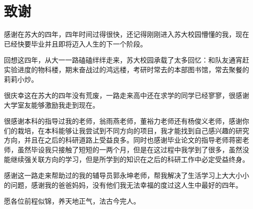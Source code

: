 \section*{致谢}

感谢在苏大的四年，四年时间过得很快，还记得刚刚进入苏大校园懵懂的我，现在已经快要毕业并且即将迈入人生的下一个阶段。

回想这四年，从大一一路磕磕绊绊走来，苏大校园承载了太多回忆：和队友通宵赶实验进度的物科楼，期末奋战过的鸿远楼，考研时常去的本部图书馆，常去聚餐的莉莉小炒。

很庆幸这在苏大的四年没有荒废，一路走来高中还在求学的同学已经寥寥，很感谢大学室友能够激励我走到现在。

很感谢本科的指导过我的老师，翁雨燕老师，董裕力老师还有杨俊义老师，感谢你们的栽培，在本科能够让我尝试到不同方向的项目，我才能找到自己感兴趣的研究方向，并且在之后的科研道路上受益良多。同时也感谢毕业论文的指导老师蒋密老师，虽然毕设我只接触了短短的一两个月，但是在这过程中我学到了很多，虽然没能继续强关联方向的学习，但是所学到的知识在之后的科研工作中必定受益终身。

感谢这一路走来帮助过的我的辅导员郭永坤老师，帮我解决了生活学习上大大小小的问题，感谢我的爸爸妈妈，没有他们我无法幸福的度过这人生中最好的四年。

愿各位前程似锦，养天地正气，法古今完人。

